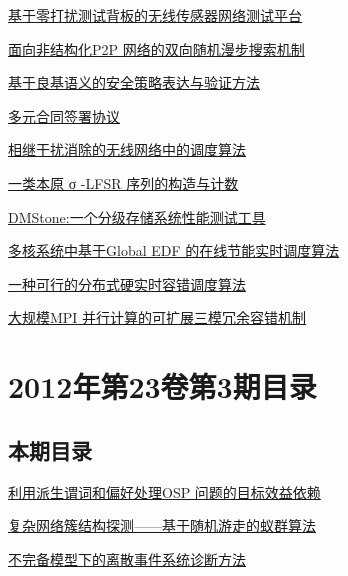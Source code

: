 \documentclass[a4paper]{article}
\begin{document}
\href{http://www.jos.org.cn/ch/reader/download_pdf.aspx?file_no=4013&year_id=2012&quarter_id=4&falg=1}{基于零打扰测试背板的无线传感器网络测试平台}

\href{http://www.jos.org.cn/ch/reader/download_pdf.aspx?file_no=4086&year_id=2012&quarter_id=4&falg=1}{面向非结构化P2P 网络的双向随机漫步搜索机制}

\href{http://www.jos.org.cn/ch/reader/download_pdf.aspx?file_no=4023&year_id=2012&quarter_id=4&falg=1}{基于良基语义的安全策略表达与验证方法}

\href{http://www.jos.org.cn/ch/reader/download_pdf.aspx?file_no=4024&year_id=2012&quarter_id=4&falg=1}{多元合同签署协议}

\href{http://www.jos.org.cn/ch/reader/download_pdf.aspx?file_no=4035&year_id=2012&quarter_id=4&falg=1}{相继干扰消除的无线网络中的调度算法}

\href{http://www.jos.org.cn/ch/reader/download_pdf.aspx?file_no=4006&year_id=2012&quarter_id=4&falg=1}{一类本原 σ -LFSR 序列的构造与计数}

\href{http://www.jos.org.cn/ch/reader/download_pdf.aspx?file_no=4046&year_id=2012&quarter_id=4&falg=1}{DMStone:一个分级存储系统性能测试工具}

\href{http://www.jos.org.cn/ch/reader/download_pdf.aspx?file_no=4054&year_id=2012&quarter_id=4&falg=1}{多核系统中基于Global EDF 的在线节能实时调度算法}

\href{http://www.jos.org.cn/ch/reader/download_pdf.aspx?file_no=4004&year_id=2012&quarter_id=4&falg=1}{一种可行的分布式硬实时容错调度算法}

\href{http://www.jos.org.cn/ch/reader/download_pdf.aspx?file_no=4011&year_id=2012&quarter_id=4&falg=1}{大规模MPI 并行计算的可扩展三模冗余容错机制}


\section{\textbf{2012年第23卷第3期目录}}
\subsection{本期目录}
\href{http://www.jos.org.cn/ch/reader/download_pdf.aspx?file_no=3985&year_id=2012&quarter_id=3&falg=1}{利用派生谓词和偏好处理OSP 问题的目标效益依赖}

\href{http://www.jos.org.cn/ch/reader/download_pdf.aspx?file_no=3996&year_id=2012&quarter_id=3&falg=1}{复杂网络簇结构探测——基于随机游走的蚁群算法}

\href{http://www.jos.org.cn/ch/reader/download_pdf.aspx?file_no=4028&year_id=2012&quarter_id=3&falg=1}{不完备模型下的离散事件系统诊断方法}
\end{document}

